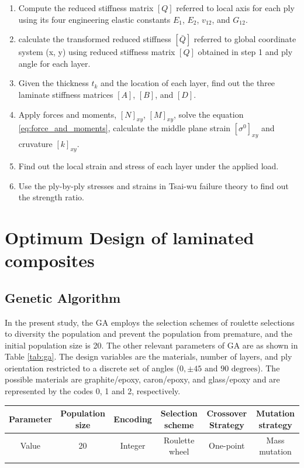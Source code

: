 \documentclass[smallextended]{svjour3}       %
\begin{document}
\begin{enumerate}
	\item Compute the reduced stiffness matrix $[Q]$ referred to local axis for each ply using its
		four engineering elastic constants $E_1$, $E_2$, $v_{12}$, and $G_{12}$.
	\item calculate the transformed reduced stiffness $[\bar{Q}]$ referred to global coordinate
		system (x, y) using reduced stiffness matrix $[Q]$ obtained in step 1 and ply angle for each layer.
	\item Given the thickness $t_k$ and the location of each layer, find out the three laminate
		stiffness matrices $[A]$, $[B]$, and $[D]$.
	\item Apply forces and moments, $[N]_{xy}$, $[M]_{xy}$, solve the equation
		\ref{eq:force_and_moments}, calculate the middle plane strain $[\sigma^0]_{xy}$ and
		cruvature $[k]_{xy}$.
	\item Find out the local strain and stress of each layer under the applied load.
	\item Use the ply-by-ply stresses and strains in Tsai-wu failure theory to find out the strength
		ratio.
\end{enumerate}

\section {Optimum Design of laminated composites}
\subsection{Genetic Algorithm}
In the present study,  the GA employs the selection schemes of roulette
selections to diversity the population and prevent the population from premature, and the initial
population size is 20. The other relevant parameters of GA are as shown in Table \ref{tab:ga}. The design
variables are the materials, number of layers, and ply orientation restricted to a discrete set of
angles ($0,\pm 45 \text{ and } 90 \text{ degrees} $). The possible materials are graphite/epoxy, caron/epoxy, and
glass/epoxy and are represented by the codes 0, 1 and 2, respectively.

\begin{center}
\begin{tabular}{cccccc}
	\toprule
	Parameter &  Population size & Encoding & Selection scheme& Crossover Strategy& Mutation strategy\\
	\midrule
	Value     & 20               & Integer  & Roulette wheel  & One-point &Mass mutation   \\
	\bottomrule
	\label{tab:ga}
\end{tabular}
\end{center}
\end{document}
